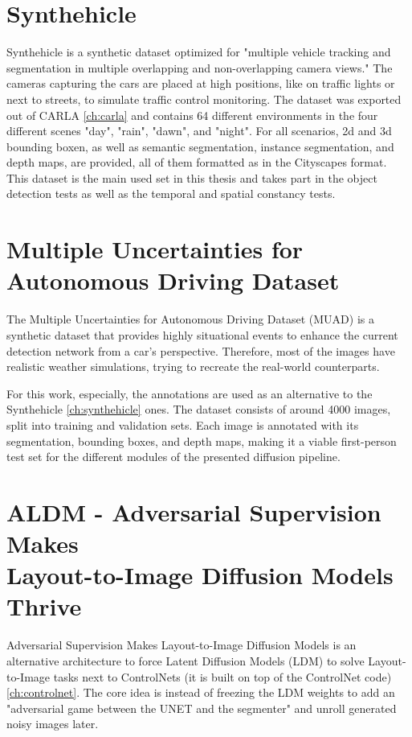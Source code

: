 \section{Synthehicle}
\label{ch:synthehicle}
Synthehicle \cite{Herzog_2023_WACV} is a synthetic dataset optimized for "multiple vehicle tracking and segmentation in multiple overlapping and non-overlapping camera views." The cameras capturing the cars are placed at high positions, like on traffic lights or next to streets, to simulate traffic control monitoring. The dataset was exported out of CARLA \autoref{ch:carla} and contains 64 different environments in the four different scenes "day", "rain", "dawn", and "night". For all scenarios, 2d and 3d bounding boxen, as well as semantic segmentation, instance segmentation, and depth maps, are provided, all of them formatted as in the Cityscapes format. \cite{Herzog_2023_WACV}
This dataset is the main used set in this thesis and takes part in the object detection tests as well as the temporal and spatial constancy tests.


\section{Multiple Uncertainties for Autonomous Driving Dataset}
\label{ch:muad}
The Multiple Uncertainties for Autonomous Driving Dataset (MUAD) \cite{Franchi2022MUAD} is a synthetic dataset that provides highly situational events to enhance the current detection network from a car's perspective. Therefore, most of the images have realistic weather simulations, trying to recreate the real-world counterparts.

For this work, especially, the annotations are used as an alternative to the Synthehicle \autoref{ch:synthehicle} ones. The dataset consists of around 4000 images, split into training and validation sets. Each image is annotated with its segmentation, bounding boxes, and depth maps, making it a viable first-person test set for the different modules of the presented diffusion pipeline. \cite{Franchi2022MUAD}



\section{ALDM - Adversarial Supervision Makes \\ Layout-to-Image Diffusion Models Thrive}
\label{ch:aldm}
Adversarial Supervision Makes Layout-to-Image Diffusion Models \cite{li2024aldm} is an alternative architecture to force Latent Diffusion Models (LDM) to solve Layout-to-Image tasks next to ControlNets (it is built on top of the ControlNet code) \autoref{ch:controlnet}. The core idea is instead of freezing the LDM weights to add an "adversarial game between the UNET \cite{ronneberger2015unetconvolutionalnetworksbiomedical} and the segmenter" \cite{li2024aldm} and unroll generated noisy images later.

